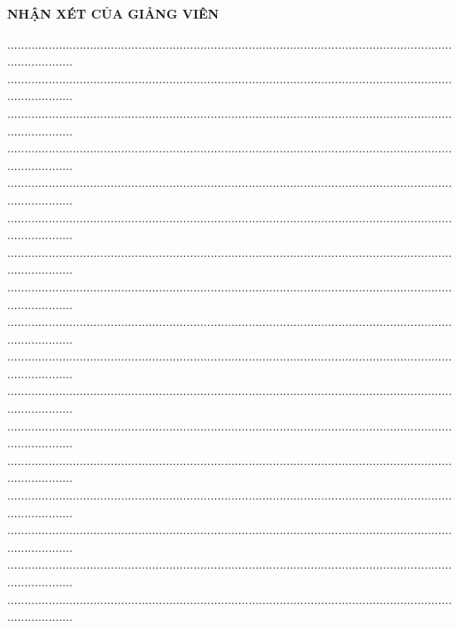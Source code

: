 \documentclass[a4paper]{article}
\begin{document}
\begin{center}
\Large\textbf{NHẬN XÉT CỦA GIẢNG VIÊN}
\end{center}
\begin{center}
....................................................................................................................................................
....................................................................................................................................................
....................................................................................................................................................
....................................................................................................................................................
....................................................................................................................................................
....................................................................................................................................................
....................................................................................................................................................
....................................................................................................................................................
....................................................................................................................................................
....................................................................................................................................................
....................................................................................................................................................
....................................................................................................................................................
....................................................................................................................................................
....................................................................................................................................................
....................................................................................................................................................
....................................................................................................................................................
....................................................................................................................................................

\end{center}
\end{document}
